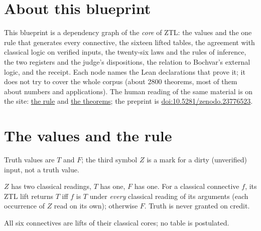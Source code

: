 
\chapter*{About this blueprint}

This blueprint is a dependency graph of the \emph{core} of ZTL: the values and
the one rule that generates every connective, the sixteen lifted tables, the
agreement with classical logic on verified inputs, the twenty-six laws and the
rules of inference, the two registers and the judge's dispositions, the
relation to Bochvar's external logic, and the receipt. Each node names the Lean
declarations that prove it; it does not try to cover the whole corpus (about
2800 theorems, most of them about numbers and applications). The human reading
of the same material is on the site:
\href{https://ztljudge.com/ztl/rule/}{the rule} and
\href{https://ztljudge.com/ztl/theorems/}{the theorems}; the preprint is
\href{https://doi.org/10.5281/zenodo.23776523}{doi:10.5281/zenodo.23776523}.

\chapter{The values and the rule}

\begin{definition}\label{def:values}
  \leanok
  Truth values are $T$ and $F$; the third symbol $Z$ is a mark for a dirty
  (unverified) input, not a truth value.
\end{definition}

\begin{definition}\label{def:lift}
  \leanok
  $Z$ has two classical readings, $T$ has one, $F$ has one. For a classical
  connective $f$, its ZTL lift returns $T$ iff $f$ is $T$ under \emph{every}
  classical reading of its arguments (each occurrence of $Z$ read on its own);
  otherwise $F$. Truth is never granted on credit.
\end{definition}

\begin{definition}[Connectives]\label{def:ops}
  \leanok
  All six connectives are lifts of their classical cores; no table is
  postulated.
\end{definition}

